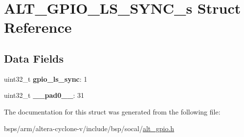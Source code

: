 \hypertarget{structALT__GPIO__LS__SYNC__s}{}\section{A\+L\+T\+\_\+\+G\+P\+I\+O\+\_\+\+L\+S\+\_\+\+S\+Y\+N\+C\+\_\+s Struct Reference}
\label{structALT__GPIO__LS__SYNC__s}
\subsection*{Data Fields}
\begin{DoxyCompactItemize}
\item 
\mbox{\label{structALT__GPIO__LS__SYNC__s_a74ec78bccf48e0cfe919208effd7f9e4}} 
uint32\+\_\+t {\bfseries gpio\+\_\+ls\+\_\+sync}\+: 1
\item 
\mbox{\label{structALT__GPIO__LS__SYNC__s_a0dfe5ec63ea502e436fd7ecf571fe802}} 
uint32\+\_\+t {\bfseries \+\_\+\+\_\+pad0\+\_\+\+\_\+}\+: 31
\end{DoxyCompactItemize}


The documentation for this struct was generated from the following file\+:\begin{DoxyCompactItemize}
\item 
bsps/arm/altera-\/cyclone-\/v/include/bsp/socal/\mbox{\hyperlink{alt__gpio_8h}{alt\+\_\+gpio.\+h}}\end{DoxyCompactItemize}
